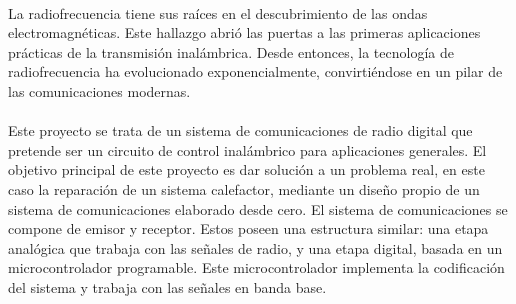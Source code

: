 \paragraph{}
La radiofrecuencia tiene sus raíces en el descubrimiento de las ondas electromagnéticas. 
Este hallazgo abrió las puertas a las primeras aplicaciones prácticas de la transmisión inalámbrica.
Desde entonces, la tecnología de radiofrecuencia ha evolucionado exponencialmente, convirtiéndose en un pilar de las comunicaciones modernas.
\paragraph{}
Este proyecto se trata de un sistema de comunicaciones de radio digital que pretende ser un circuito de control inalámbrico para aplicaciones generales. 
El objetivo principal de este proyecto es dar solución a un problema real, en este caso la reparación de un sistema calefactor, mediante un diseño propio de un sistema de comunicaciones elaborado desde cero.
El sistema de comunicaciones se compone de emisor y receptor. Estos poseen una estructura similar: una etapa analógica que trabaja con las señales de radio, y una etapa digital, basada en un microcontrolador programable. Este microcontrolador implementa la codificación del sistema y trabaja con las señales en banda base.
